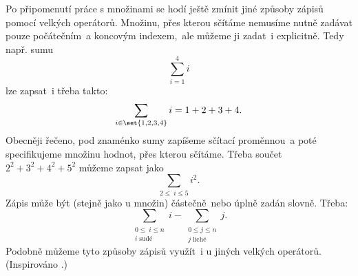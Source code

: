 Po připomenutí práce s množinami se hodí ještě zmínit jiné způsoby zápisů pomocí velkých operátorů. Množinu, přes kterou sčítáme nemusíme nutně zadávat pouze počátečním~a koncovým indexem,~ale můžeme ji zadat~i explicitně. Tedy např. sumu
\begin{equation*}
    \sum_{i=1}^{4}{i}
\end{equation*}
lze zapsat~i třeba takto:
\begin{equation*}
    \sum_{i \in \set{1,2,3,4}}{i}=1+2+3+4.
\end{equation*}
Obecněji řečeno, pod znaménko sumy zapíšeme sčítací proměnnou~a poté specifikujeme množinu hodnot, přes kterou sčítáme. Třeba součet $2^2+3^2+4^2+5^2$ můžeme zapsat jako
\begin{equation*}
    \sum_{2 \leq~i \leq 5}{i^2}.
\end{equation*}
Zápis může být (stejně jako u množin) částečně~nebo úplně zadán slovně. Třeba:
\begin{equation*}
    \sum_{\substack{0 \leq~i \leq n\\ i\;\text{sudé}}}{i}-\sum_{\substack{0 \leq j \leq n\\ j\;\text{liché}}}{j}.
\end{equation*}
Podobně můžeme tyto způsoby zápisů využít~i u jiných velkých operátorů. (Inspirováno \cite{MatousekNesetril2009}.)